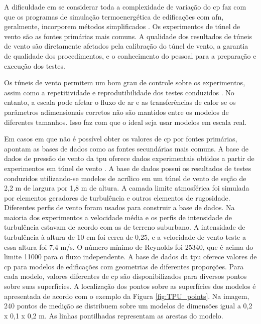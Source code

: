 \documentclass[brazil,hardcopy,openany]{ufscthesis} %
\begin{document}
A dificuldade em se considerar toda a complexidade de variação do \acrshort{cp} faz com que os programas de simulação termoenergética de edificações com \acrshort{afn}, geralmente, incorporem métodos simplificados \cite{Costola2009}. Os experimentos de túnel de vento são as fontes primárias mais comuns. A qualidade dos resultados de túneis de vento são diretamente afetados pela calibração do túnel de vento, a garantia de qualidade dos procedimentos, e o conhecimento do pessoal para a preparação e execução dos testes.

Os túneis de vento permitem um bom grau de controle sobre os experimentos, assim como a repetitividade e reprodutibilidade dos testes conduzidos \cite{Omrani2017}. No entanto, a escala pode afetar o fluxo de ar e as transferências de calor se os parâmetros adimensionais corretos não são mantidos entre os modelos de diferentes tamanhos. Isso faz com que o ideal seja usar modelos em escala real.

Em casos em que não é possível obter os valores de \acrshort{cp} por fontes primárias,  apontam as bases de dados como as fontes secundárias mais comuns.
A base de dados de pressão de vento da \acrfull{tpu} oferece dados experimentais obtidos a partir de experimentos em túnel de vento \cite{TPU2018}.
A base de dados possui os resultados de testes conduzidos utilizando-se modelos de acrílico em um túnel de vento de seção de 2,2 m de largura por 1,8 m de altura.
A camada limite atmosférica foi simulada por elementos geradores de turbulência e outros elementos de rugosidade. Diferentes perfis de vento foram usados para construir a base de dados. Na maioria dos experimentos a velocidade média e os perfis de intensidade de turbulência estavam de acordo com as de terreno suburbano. A intensidade de turbulência à altura de 10 cm foi cerca de 0,25, e a velocidade de vento teste a essa altura foi 7,4 m/s. O número mínimo de Reynolds foi 25340, que é acima do limite 11000 para o fluxo independente.
A base de dados da \acrshort{tpu} oferece valores de \acrshort{cp} para modelos de edificações com geometrias de diferentes proporções. Para cada modelo, valores diferentes de \acrshort{cp} são disponibilizados para diversos pontos sobre suas superfícies. 
A localização dos pontos sobre as superfícies dos modelos é apresentada de acordo com o exemplo da Figura \ref{fig:TPU_points}. Na imagem, 240 pontos de medição se distribuem sobre um modelos de dimensões igual a 0,2 x 0,1 x 0,2 m. As linhas pontilhadas representam as arestas do modelo.
\end{document}
